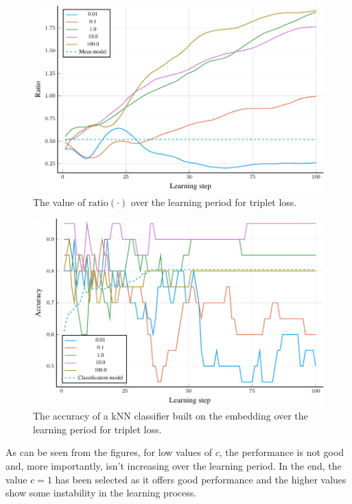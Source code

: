 \begin{figure}[h]
  \centering
  \includegraphics[width=\textwidth]{images/triplet-gridsearch/ratio/triplet-gridsearch-ratio.pdf}
  \caption{The value of \( \mathrm{ratio} \left( \cdot \right) \) over the learning period for triplet loss.}\label{fig:triplet-gridsearch-ratio}
\end{figure}

\begin{figure}[h]
  \centering
  \includegraphics[width=\textwidth]{images/triplet-gridsearch/accuracy/triplet-gridsearch-accuracy.pdf}
  \caption{The accuracy of a kNN classifier built on the embedding over the learning period for triplet loss.}\label{fig:triplet-gridsearch-accuracy}
\end{figure}

As can be seen from the figures, for low values of \( c \), the performance is not good and, more importantly, isn't increasing over the learning period. In the end, the value \( c = 1 \) has been selected as it offers good performance and the higher values show some instability in the learning process.

